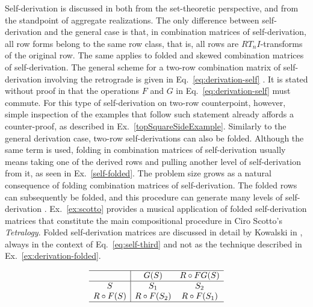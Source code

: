Self-derivation is discussed in \cite[217, 226]{Starr1984} both from the set-theoretic perspective, and from the standpoint of aggregate realizations. The only difference between self-derivation and the general case is that, in combination matrices of self-derivation, all row forms belong to the same row class, that is, all rows are $RT_nI$-transforms of the original row. The same applies to folded and skewed combination matrices of self-derivation. The general scheme for a two-row combination matrix of self-derivation involving the retrograde is given in Eq.~\ref{eq:derivation-self} \cite[219]{Starr1984}. It is stated without proof in \cite[217]{Starr1984} that the operations $F$ and $G$ in Eq.~\ref{eq:derivation-self} must commute. For this type of self-derivation on two-row counterpoint, however, simple inspection of the examples that follow such statement already affords a counter-proof, as described in Ex.~\ref{topSquareSideExample}. Similarly to the general derivation case, two-row self-derivations can also be folded. Although the same term is used, folding in combination matrices of self-derivation usually means taking one of the derived rows and pulling another level of self-derivation from it, as seen in Ex.~\ref{self-folded}. The problem size grows as a natural consequence of folding combination matrices of self-derivation. The folded rows can subsequently be folded, and this procedure can generate many levels of self-derivation \cite[221]{Starr1984}. Ex.~\ref{ex:scotto} provides a musical application of folded self-derivation matrices that constitute the main compositional procedure in Ciro Scotto's \emph{Tetralogy}. Folded self-derivation matrices are discussed in detail by Kowalski in \cite{Kowalski1987a}, always in the context of Eq.~\ref{eq:self-third} and not as the technique described in Ex.~\ref{ex:derivation-folded}.

\begin{equation}
\begin{array}{c|cc}
	\hline
    & G(S) & R \circ FG(S) \\
    \hline
    S & S_1 & S_2 \\
    R \circ F(S) & R \circ F(S_2) & R \circ F(S_1) \\
    \hline
\end{array}
\label{eq:derivation-self}
\end{equation}

